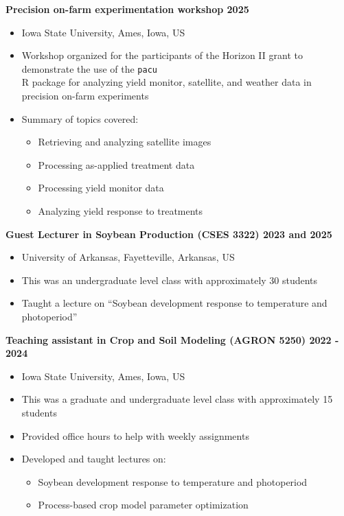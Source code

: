 \documentclass[letterpaper,10pt]{article}
\begin{document}
{\bf Precision on-farm experimentation workshop  \hfill  2025}
\vspace{-.1in}
\begin{itemize}
\itemsep-0.5em
\renewcommand\labelitemi{{\boldmath$\cdot$}}
\item  Iowa State University, Ames, Iowa, US
\item Workshop organized for the participants of
	the Horizon II grant to demonstrate the use of
	the \texttt{pacu}\\ R package for analyzing
	yield monitor, satellite, and weather data
	in precision on-farm experiments
\item Summary of topics covered:
\vspace{-.1in}
\begin{itemize}	
\itemsep-0.2em
\item Retrieving and analyzing satellite images
\item Processing as-applied treatment data
\item Processing yield monitor data
\item Analyzing yield response to treatments
\end{itemize}
\end{itemize}


{\bf Guest Lecturer in Soybean Production (CSES 3322) \hfill  2023 and 2025}
\vspace{-.1in}
\begin{itemize}
\itemsep-0.5em
\renewcommand\labelitemi{{\boldmath$\cdot$}}
\item 
University of Arkansas, Fayetteville, Arkansas, US
\item This was an undergraduate level class with approximately 30 students
\item Taught a lecture on ``Soybean development
	response to temperature and photoperiod''
\end{itemize}


{\bf Teaching assistant in Crop and Soil Modeling
(AGRON 5250) \hfill  2022 - 2024}
\vspace{-.1in}
\begin{itemize}
\itemsep-0.5em
\renewcommand\labelitemi{{\boldmath$\cdot$}}
\item  Iowa State University, Ames, Iowa, US
\item This was a graduate and undergraduate level class with approximately 15 students
\item Provided office hours to help with weekly
	assignments
\item Developed and taught lectures on:
\vspace{-.1in}
\begin{itemize}	
\itemsep-0.2em
\item Soybean development response to temperature and photoperiod
\item Process-based crop model parameter optimization
\end{itemize}
\end{itemize}
\end{document}
